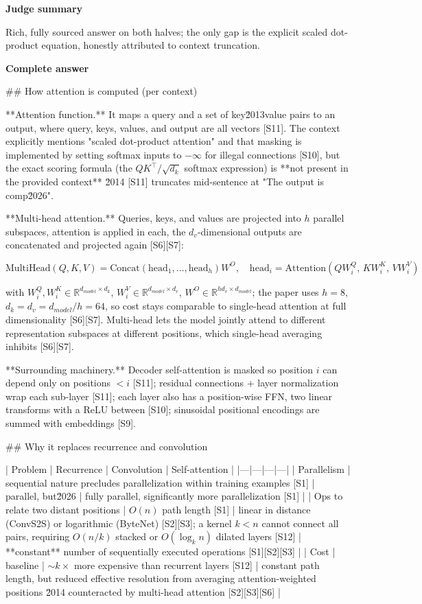 \documentclass[10pt]{article}
\begin{document}
\textbf{Judge summary}
\begin{EvidenceText}
Rich, fully sourced answer on both halves; the only gap is the explicit scaled dot-product equation, honestly attributed to context truncation.
\end{EvidenceText}

\textbf{Complete answer}
\begin{AnswerText}
## How attention is computed (per context)

**Attention function.** It maps a query and a set of key\u2013value pairs to an output, where query, keys, values, and output are all vectors [S11]. The context explicitly mentions "scaled dot-product attention" and that masking is implemented by setting softmax inputs to $-\infty$ for illegal connections [S10], but the exact scoring formula (the $QK^\top/\sqrt{d_k}$ softmax expression) is **not present in the provided context** \u2014 [S11] truncates mid-sentence at "The output is comp\u2026".

**Multi-head attention.** Queries, keys, and values are projected into $h$ parallel subspaces, attention is applied in each, the $d_v$-dimensional outputs are concatenated and projected again [S6][S7]:

$$\mathrm{MultiHead}(Q,K,V)=\mathrm{Concat}(\mathrm{head}_1,\dots,\mathrm{head}_h)W^O,\quad \mathrm{head}_i=\mathrm{Attention}(QW_i^Q,\,KW_i^K,\,VW_i^V)$$

with $W_i^Q,W_i^K\in\mathbb{R}^{d_{model}\times d_k}$, $W_i^V\in\mathbb{R}^{d_{model}\times d_v}$, $W^O\in\mathbb{R}^{hd_v\times d_{model}}$; the paper uses $h=8$, $d_k=d_v=d_{model}/h=64$, so cost stays comparable to single-head attention at full dimensionality [S6][S7]. Multi-head lets the model jointly attend to different representation subspaces at different positions, which single-head averaging inhibits [S6][S7].

**Surrounding machinery.** Decoder self-attention is masked so position $i$ can depend only on positions $<i$ [S11]; residual connections + layer normalization wrap each sub-layer [S11]; each layer also has a position-wise FFN, two linear transforms with a ReLU between [S10]; sinusoidal positional encodings are summed with embeddings [S9].

## Why it replaces recurrence and convolution

| Problem | Recurrence | Convolution | Self-attention |
|---|---|---|---|
| Parallelism | sequential nature precludes parallelization within training examples [S1] | parallel, but\u2026 | fully parallel, significantly more parallelization [S1] |
| Ops to relate two distant positions | $O(n)$ path length [S1] | linear in distance (ConvS2S) or logarithmic (ByteNet) [S2][S3]; a kernel $k<n$ cannot connect all pairs, requiring $O(n/k)$ stacked or $O(\log_k n)$ dilated layers [S12] | **constant** number of sequentially executed operations [S1][S2][S3] |
| Cost | baseline | $\sim k\times$ more expensive than recurrent layers [S12] | constant path length, but reduced effective resolution from averaging attention-weighted positions \u2014 counteracted by multi-head attention [S2][S3][S6] |


\end{AnswerText}
\end{document}
